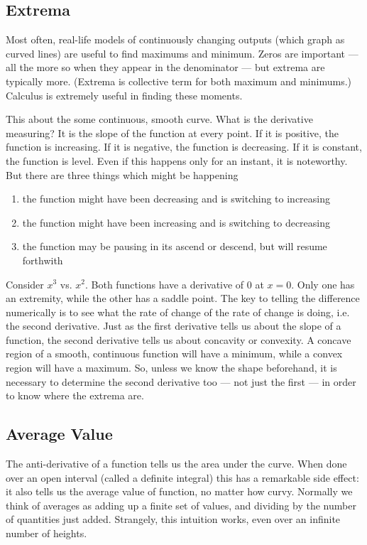 

\subsection{Extrema}
Most often, real-life models of continuously changing outputs (which graph as curved lines)
are useful to find maximums and minimum.  Zeros are important --- all the more so when
they appear in the denominator --- but extrema are typically more.  (Extrema is collective
term for both maximum and minimums.)  Calculus is extremely useful in finding these moments.

This about the some continuous, smooth curve.  What is the derivative measuring?  It is the
slope of the function at every point.  If it is positive, the function is increasing.  If it is
negative, the function is decreasing.  If it is constant, the function is level.  Even if this happens
only for an instant, it is noteworthy.  But there are three things which might be happening
\begin{enumerate}
\item the function might have been decreasing and is switching to increasing
\item the function might have been increasing and is switching to decreasing
\item the function may be pausing in its ascend or descend, but will resume forthwith
\end{enumerate}

Consider $x^3$ vs. $x^2$.  Both functions have a derivative of 0 at $x=0$.  Only one has
an extremity, while the other has a saddle point.  The key to telling the difference numerically
is to see what the rate of change of the rate of change is doing, i.e. the second derivative.
Just as the first derivative tells us about the slope of a function, the second derivative tells us about
concavity or convexity.  A concave region of a smooth, continuous function will have a minimum,
while a convex region will have a maximum.  So, unless we know the shape beforehand,
it is necessary to determine the second derivative too --- not just the first --- in order to know
where the extrema are.


\subsection{Average Value}
The anti-derivative of a function tells us the area under the curve.  When done over an open
interval (called a definite integral) this has a remarkable side effect: it also tells us the average
value of function, no matter how curvy.  Normally we think of averages as adding up a finite set 
of values, and dividing by the number of quantities just added.  Strangely, this intuition works,
even over an infinite number of heights.

